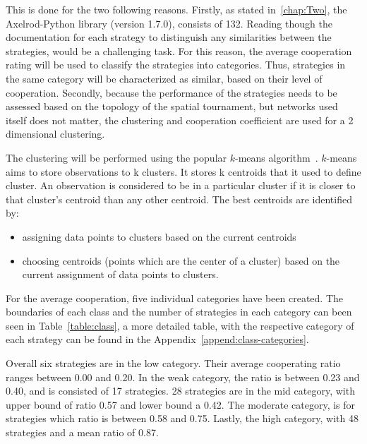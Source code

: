 This is done for the two following reasons. Firstly, as stated in~\autoref{chap:Two},
the Axelrod-Python library (version 1.7.0), consists of 132. Reading though
the documentation for each strategy to distinguish any similarities between
the strategies, would be a challenging task. For this reason, the average cooperation
rating will be used to classify the strategies into categories. Thus, strategies
in the same category will be characterized as similar, based on their level of
cooperation. Secondly, because the performance of the strategies needs to be assessed
based on the topology of the spatial tournament, but networks used itself does
not matter, the clustering and cooperation coefficient are used for a 2 dimensional
clustering.

The clustering will be performed using the popular \(k\)-means algorithm~\cite{kmeans}.
\(k\)-means aims to store observations to k clusters. It stores k centroids
that it used to define cluster. An observation is considered to be in a
particular cluster if it is closer to that cluster's centroid than any other
centroid. The best centroids are identified by:
\begin{itemize}
	\item assigning data points to clusters based on the current centroids
	\item choosing centroids (points which are the center of a cluster) based on
	      the current assignment of data points to clusters.
\end{itemize}

For the average cooperation, five individual categories have been created.
The boundaries of each class and the number of strategies in each category
can been seen in Table~\ref{table:class}, a more detailed table, with the respective category of each
strategy can be found in the Appendix~\ref{append:class-categories}.

Overall six strategies are in the low category. Their average cooperating ratio
ranges between 0.00 and 0.20. In the weak category, the ratio is between
0.23 and 0.40, and is consisted of 17 strategies. 28 strategies are
in the mid category, with upper bound of ratio 0.57 and lower bound a 0.42.
The moderate category, is for strategies which ratio is between 0.58 and 0.75.
Lastly, the high category, with 48 strategies and a mean ratio of 0.87.

